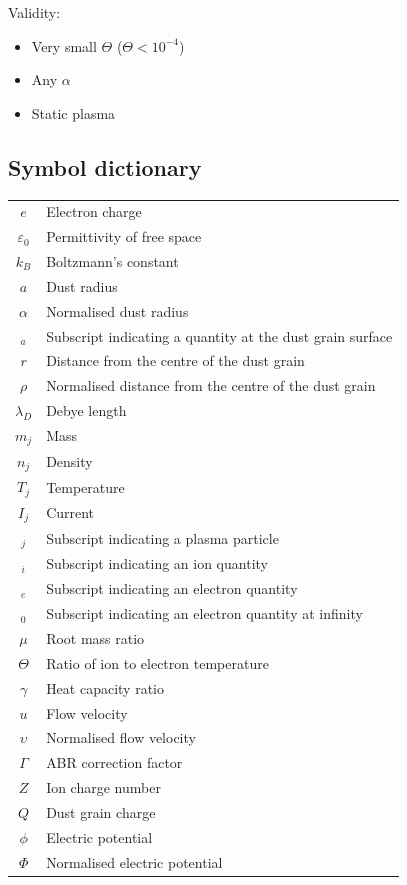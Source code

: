 \documentclass[journal]{Imperial_lab_report}
\begin{document}
\medskip

Validity:

\medskip

\begin{itemize}
\item Very small $\Theta$ ($\Theta < 10^{-4}$)
\item Any $\alpha$
\item Static plasma
\end{itemize}

\subsection{Symbol dictionary}
\begin{center}
\begin{tabular}{cl} 

$e$ & Electron charge \\
$\varepsilon_0$ & Permittivity of free space \\
$k_B$ & Boltzmann's constant \\
$a$ & Dust radius\\
$\alpha$ & Normalised dust radius \\
$_a$ & Subscript indicating a quantity at the dust grain surface \\
$r$ & Distance from the centre of the dust grain \\
$\rho$ & Normalised distance from the centre of the dust grain \\
$\lambda_D$ & Debye length \\
$m_j$ & Mass \\
$n_j$ & Density \\
$T_j$ & Temperature \\
$I_j$ & Current \\
$_j$ & Subscript indicating a plasma particle \\
$_i$ & Subscript indicating an ion quantity \\
$_e$ & Subscript indicating an electron quantity \\
$_0$ & Subscript indicating an electron quantity at infinity \\
$\mu$ & Root mass ratio\\
$\Theta$ & Ratio of ion to electron temperature \\
$\gamma$ & Heat capacity ratio \\
$u$ & Flow velocity \\
$\upsilon$ & Normalised flow velocity \\
$\Gamma$ & ABR correction factor \\
$Z$ & Ion charge number \\
$Q$ & Dust grain charge \\
$\phi$ & Electric potential \\
$\Phi$ & Normalised electric potential \\

\end{tabular}
\end{center}
\end{document}
